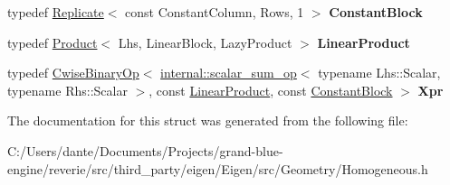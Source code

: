 \begin{DoxyCompactItemize}
\mbox{\label{struct_eigen_1_1internal_1_1homogeneous__right__product__refactoring__helper_a294c6f0baad3356b50ce4ed884873430}} 
typedef \mbox{\hyperlink{class_eigen_1_1_replicate}{Replicate}}$<$ const Constant\+Column, Rows, 1 $>$ {\bfseries Constant\+Block}
\item 
\mbox{\label{struct_eigen_1_1internal_1_1homogeneous__right__product__refactoring__helper_ad60a835dcc4b95f5118123bb5e5cfb53}} 
typedef \mbox{\hyperlink{class_eigen_1_1_product}{Product}}$<$ Lhs, Linear\+Block, Lazy\+Product $>$ {\bfseries Linear\+Product}
\item 
\mbox{\label{struct_eigen_1_1internal_1_1homogeneous__right__product__refactoring__helper_aeaa3560faf70646f25a02c521bc42f26}} 
typedef \mbox{\hyperlink{class_eigen_1_1_cwise_binary_op}{Cwise\+Binary\+Op}}$<$ \mbox{\hyperlink{struct_eigen_1_1internal_1_1scalar__sum__op}{internal\+::scalar\+\_\+sum\+\_\+op}}$<$ typename Lhs\+::\+Scalar, typename Rhs\+::\+Scalar $>$, const \mbox{\hyperlink{class_eigen_1_1_product}{Linear\+Product}}, const \mbox{\hyperlink{class_eigen_1_1_replicate}{Constant\+Block}} $>$ {\bfseries Xpr}
\end{DoxyCompactItemize}


The documentation for this struct was generated from the following file\+:\begin{DoxyCompactItemize}
\item 
C\+:/\+Users/dante/\+Documents/\+Projects/grand-\/blue-\/engine/reverie/src/third\+\_\+party/eigen/\+Eigen/src/\+Geometry/Homogeneous.\+h\end{DoxyCompactItemize}
